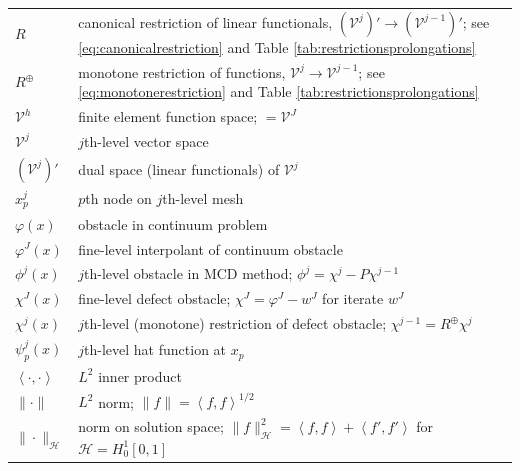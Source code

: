 \documentclass[letterpaper,final,12pt,reqno]{amsart}
\theoremstyle{claim}
\newcommand{\ip}[2]{\left<#1,#2\right>}
\newcommand{\mR}{R^{\bm{\oplus}}}
\numberwithin{equation}{section}
\numberwithin{figure}{section}
\numberwithin{table}{section}
\numberwithin{theorem}{section}
\begin{document}
\begin{longtable}{l|l}
$R$ & canonical restriction of linear functionals, $(\mathcal{V}^j)' \to (\mathcal{V}^{j-1})'$; see \eqref{eq:canonicalrestriction} and Table \ref{tab:restrictionsprolongations} \\
$\mR$ & monotone restriction of functions, $\mathcal{V}^j \to \mathcal{V}^{j-1}$; see \eqref{eq:monotonerestriction} and Table \ref{tab:restrictionsprolongations} \\
$\mathcal{V}^h$ & finite element function space; $= \mathcal{V}^J$ \\
$\mathcal{V}^j$ & $j$th-level vector space \\
$(\mathcal{V}^j)'$ & dual space (linear functionals) of $\mathcal{V}^j$  \\
$x_p^j$ & $p$th node on $j$th-level mesh \\
$\varphi(x)$ & obstacle in continuum problem \\
$\varphi^J(x)$ & fine-level interpolant of continuum obstacle \\
$\phi^j(x)$ & $j$th-level obstacle in MCD method; $\phi^j=\chi^j - P\chi^{j-1}$ \\
$\chi^J(x)$ & fine-level defect obstacle; $\chi^J = \varphi^J - w^J$ for iterate $w^J$ \\
$\chi^j(x)$ & $j$th-level (monotone) restriction of defect obstacle; $\chi^{j-1} = \mR \chi^j$ \\
$\psi_p^j(x)$ & $j$th-level hat function at $x_p$ \\
$\ip{\cdot}{\cdot}$ & $L^2$ inner product \\
$\|\cdot\|$ & $L^2$ norm; $\|f\|=\ip{f}{f}^{1/2}$ \\
$\|\cdot\|_{\mathcal{H}}$ & norm on solution space; $\|f\|_{\mathcal{H}}^2 =\ip{f}{f} + \ip{f'}{f'}$ for $\mathcal{H}=H_0^1[0,1]$
\end{longtable}
\end{document}
